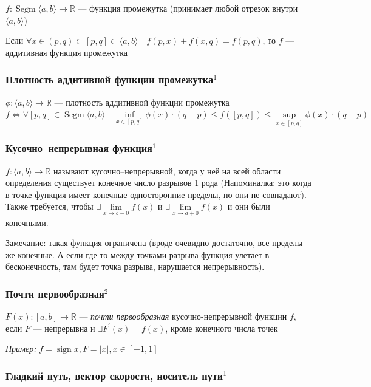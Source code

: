 \documentclass{article}
\DeclareMathOperator{\sign}{sign}
\DeclareMathOperator{\segm}{Segm}
\begin{document}
$f: \segm\langle a, b \rangle \rightarrow \mathbb{R}$ --- функция промежутка (принимает любой отрезок внутри $\langle a, b \rangle$)

Если $\forall x \in (p, q) \subset [p, q] \subset \langle a, b \rangle \quad f(p, x) + f(x, q) = f(p, q)$, то $f$ --- аддитивная функция промежутка


\subsubsection{Плотность аддитивной функции промежутка\texorpdfstring{$^1$}{}}
$\phi: \langle a, b \rangle \rightarrow \mathbb{R}$ --- плотность аддитивной функции промежутка $ f \Leftrightarrow \forall [p, q] \in \segm \langle a, b \rangle \quad \inf\limits_{x\in [p, q]} \phi(x) \cdot (q-p) \le f([p, q]) \le \sup\limits_{x\in [p, q]} \phi(x) \cdot (q-p)$

\subsubsection{Кусочно--непрерывная функция\texorpdfstring{$^1$}{}}
$f: \langle a, b \rangle \rightarrow \mathbb{R}$ называют кусочно--непрерывной, когда у неё на всей области определения существует конечное число разрывов 1 рода (Напоминалка: это когда в точке функция имеет конечные односторонние пределы, но они не совпадают). Также требуется, чтобы $\exists \lim\limits_{x\rightarrow b-0} f(x)$ и $\exists \lim\limits_{x\rightarrow a + 0} f(x)$ и они были конечными.

Замечание: такая функция ограничена (вроде очевидно достаточно, все пределы же конечные. А если где-то между точками разрыва функция улетает в бесконечность, там будет точка разрыва, нарушается непрерывность). 

\subsubsection{Почти первообразная\texorpdfstring{$^2$}{}}

$F(x): \left[a, b\right] \rightarrow \mathbb{R}$ --- \textit{почти первообразная} кусочно-непрерывной функции $f$, если $F$ --- непрерывна и $\exists F^\prime(x) = f(x)$, кроме конечного числа точек 

\textit{Пример:} $f = \sign x, F = |x|, x \in \left[-1, 1\right]$
\subsubsection{Гладкий путь, вектор скорости, носитель пути\texorpdfstring{$^1$}{}}
\end{document}
